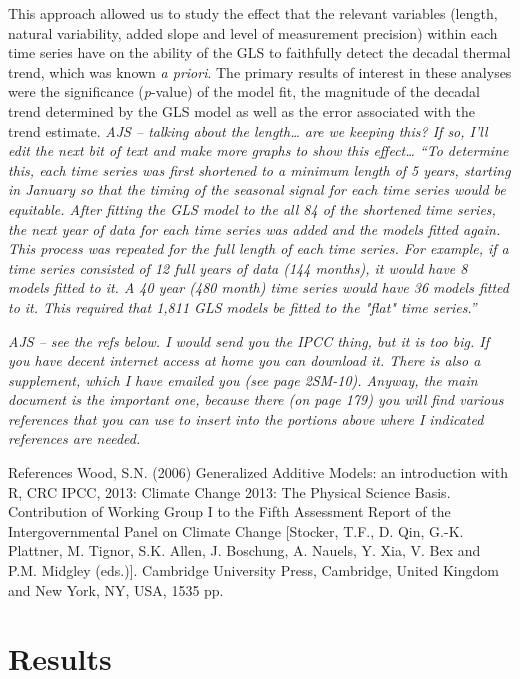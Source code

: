 \documentclass{ametsoc}
\begin{document}
This approach allowed us to study the effect that the relevant variables (length, natural variability, added slope and level of measurement precision) within each time series have on the ability of the GLS to faithfully detect the decadal thermal trend, which was known \emph{a priori}. The primary results of interest in these analyses were the significance (\emph{p}-value) of the model fit, the magnitude of the decadal trend determined by the GLS model as well as the error associated with the trend estimate. \emph{AJS – talking about the length… are we keeping this? If so, I’ll edit the next bit of text and make more graphs to show this effect… “To determine this, each time series was first shortened to a minimum length of 5 years, starting in January so that the timing of the seasonal signal for each time series would be equitable. After fitting the GLS model to the all 84 of the shortened time series, the next year of data for each time series was added and the models fitted again. This process was repeated for the full length of each time series. For example, if a time series consisted of 12 full years of data (144 months), it would have 8 models fitted to it. A 40 year (480 month) time series would have 36 models fitted to it. This required that 1,811 GLS models be fitted to the "flat" time series.”} 

\emph{AJS – see the refs below. I would send you the IPCC thing, but it is too big. If you have decent internet access at home you can download it. There is also a supplement, which I have emailed you (see page 2SM-10). Anyway, the main document is the important one, because there (on page 179) you will find various references that you can use to insert into the portions above where I indicated references are needed.}

References
Wood, S.N. (2006) Generalized Additive Models: an introduction with R, CRC
IPCC, 2013: Climate Change 2013: The Physical Science Basis. Contribution of Working Group I to the Fifth Assessment Report of the Intergovernmental Panel on Climate Change [Stocker, T.F., D. Qin, G.-K. Plattner, M. Tignor, S.K. Allen, J. Boschung, A. Nauels, Y. Xia, V. Bex and P.M. Midgley (eds.)]. Cambridge University Press, Cambridge, United Kingdom and New York, NY, USA, 1535 pp. 



\section{Results}
\end{document}

